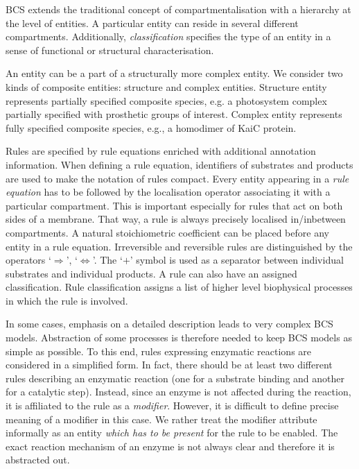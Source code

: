 \documentclass[12pt]{fithesis2}
\begin{document}
BCS extends the traditional concept of compartmentalisation with a hierarchy at the level of entities. A particular entity can reside in several different compartments. Additionally, \emph{classification} specifies the type of an entity in a sense of functional or structural characterisation.

An entity can be a part of a structurally more complex entity. We consider two kinds of composite entities: structure and complex entities. Structure entity represents partially specified composite species, e.g. a photosystem complex partially specified with prosthetic groups of interest. Complex entity represents fully specified composite species, e.g., a homodimer of KaiC protein.

Rules are specified by rule equations enriched with additional annotation information. When defining a rule equation, identifiers of substrates and products are used to make the notation of rules compact. Every entity appearing in a \emph{rule equation} has to be followed by the localisation operator associating it with a particular compartment. This is important especially for rules that act on both sides of a membrane. That way, a rule is always precisely localised in/inbetween compartments. A natural stoichiometric coefficient can be placed before any entity in a rule equation. Irreversible and reversible rules are distinguished by the operators `$\Rightarrow$', `$\Leftrightarrow$'. The `$+$' symbol is used as a separator between individual substrates and individual products. A rule can also have an assigned classification. Rule classification assigns a list of higher level biophysical processes in which the rule is involved. 

In some cases, emphasis on a detailed description leads to very complex BCS models. Abstraction of some processes is therefore needed to keep BCS models as simple as possible. To this end, rules expressing enzymatic reactions are considered in a simplified form. In fact, there should be at least two different rules describing an enzymatic reaction (one for a substrate binding and another for a catalytic step). Instead, since an enzyme is not affected during the reaction, it is affiliated to the rule as a \emph{modifier}. However, it is difficult to define precise meaning of a modifier in this case. We rather treat the modifier attribute informally as an entity \textit{which has to be present} for the rule to be enabled. The exact reaction mechanism of an enzyme is not always clear and therefore it is abstracted out.
\end{document}
